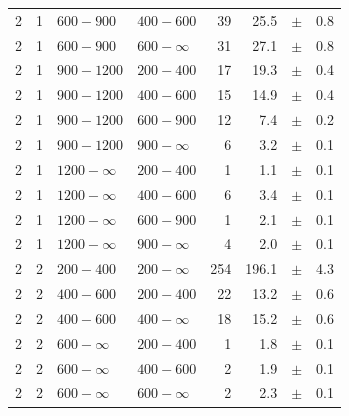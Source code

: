 \begin{table}[!h]
\begin{tabular}{rrllrrcl}
2 & 1 & $ 600- 900$ & $400-600$ &     39 &     25.5 &$\pm$&    0.8 \\
2 & 1 & $ 600- 900$ & $600-\infty$ &     31 &     27.1 &$\pm$&    0.8 \\
2\T & 1 & $ 900-1200$ & $200-400$ &     17 &     19.3 &$\pm$&    0.4 \\
2 & 1 & $ 900-1200$ & $400-600$ &     15 &     14.9 &$\pm$&    0.4 \\
2 & 1 & $ 900-1200$ & $600-900$ &     12 &      7.4 &$\pm$&    0.2 \\
2 & 1 & $ 900-1200$ & $900-\infty$ &      6 &      3.2 &$\pm$&    0.1 \\
2\T & 1 & $1200- \infty$ & $200-400$ &      1 &      1.1 &$\pm$&    0.1 \\
2 & 1 & $1200- \infty$ & $400-600$ &      6 &      3.4 &$\pm$&    0.1 \\
2 & 1 & $1200- \infty$ & $600-900$ &      1 &      2.1 &$\pm$&    0.1 \\
2 & 1 & $1200- \infty$ & $900-\infty$ &      4 &      2.0 &$\pm$&    0.1 \\
2\T & 2 & $ 200- 400$ & $200-\infty$ &    254 &    196.1 &$\pm$&    4.3 \\
2\T & 2 & $ 400- 600$ & $200-400$ &     22 &     13.2 &$\pm$&    0.6 \\
2 & 2 & $ 400- 600$ & $400-\infty$ &     18 &     15.2 &$\pm$&    0.6 \\
2\T & 2 & $ 600- \infty$ & $200-400$ &      1 &      1.8 &$\pm$&    0.1 \\
2 & 2 & $ 600- \infty$ & $400-600$ &      2 &      1.9 &$\pm$&    0.1 \\
2 & 2 & $ 600- \infty$ & $600-\infty$ &      2 &      2.3 &$\pm$&    0.1 \\
    \hline
  \end{tabular}
\end{table}


